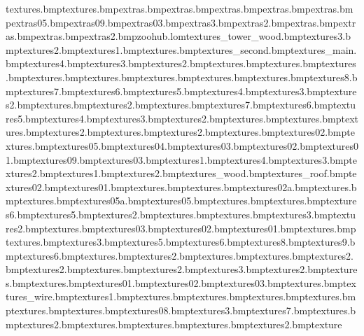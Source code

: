 textures\planetx.bmp textures\grassy.bmp extras\zoohubxdoor.bmp extras\westhubxdoor.bmp extras\tazmaniahubxdoor.bmp extras\tazcageroof.bmp extras\tazcage.bmp extras\spookystake05.bmp extras\snowbeam09.bmp extras\snowbeam03.bmp extras\safwarmwood3.bmp extras\safwarmwood2.bmp extras\safwarmwood.bmp extras\metaledges.bmp extras\cityhubxdoor.bmp extras\aquasandcas2.bmp zoohub.lom textures\zoo_tower_wood.bmp textures\zoosign3.bmp textures\zoosign2.bmp textures\zoosign1.bmp textures\zoopathjoiner.bmp textures\zoohub_second.bmp textures\zoohub_main.bmp textures\zoohubwall4.bmp textures\zoohubwall3.bmp textures\zoohubwall2.bmp textures\zoohubwall.bmp textures\zoohubpillersaf.bmp textures\zoohubpillerice.bmp textures\zoohubpilleraqua.bmp textures\zoohubpiller.bmp textures\zoohubpathisaf.bmp textures\zoohubpathice.bmp textures\zoohubpathaqua.bmp textures\zoohubpath8.bmp textures\zoohubpath7.bmp textures\zoohubpath6.bmp textures\zoohubpath5.bmp textures\zoohubpath4.bmp textures\zoohubpath3.bmp textures\zoohubpath2.bmp textures\zoohubpath.bmp textures\zoohubjetty2.bmp textures\zoohubjetty.bmp textures\zoohubgrass7.bmp textures\zoohubgrass6.bmp textures\zoohubgrass5.bmp textures\zoohubgrass4.bmp textures\zoohubgrass3.bmp textures\zoohubgrass2.bmp textures\zoohubgrass.bmp textures\zoohubgate.bmp textures\zoohubbankedge.bmp textures\yellow2.bmp textures\wtcane.bmp textures\woodplank2.bmp textures\woodplank.bmp textures\woodblock02.bmp textures\wires.bmp textures\whackbit05.bmp textures\whackbit04.bmp textures\whackbit03.bmp textures\whackbit02.bmp textures\whackbit01.bmp textures\waterfall09.bmp textures\waterfall03.bmp textures\trunkred1.bmp textures\trunk4.bmp textures\trunk3.bmp textures\trunk2.bmp textures\trunk1.bmp textures\treeleave2.bmp textures\tower_wood.bmp textures\tower_roof.bmp textures\tower02.bmp textures\tower01.bmp textures\tower.bmp textures\test.bmp textures\tazwood02a.bmp textures\tazwantedposback.bmp textures\tazwanted.bmp textures\tazfern05a.bmp textures\tazfern05.bmp textures\tazcageroof.bmp textures\tazcageplaque.bmp textures\tazcagelock6.bmp textures\tazcagelock5.bmp textures\tazcagelock2.bmp textures\tazcagelock.bmp textures\tazcagegrass.bmp textures\tazcage3.bmp textures\tazcage2.bmp textures\tazcage.bmp textures\splinter03.bmp textures\splinter02.bmp textures\splinter01.bmp textures\alightfloor.bmp textures\alightroof.bmp textures\animalcrate3.bmp textures\animalcrate5.bmp textures\animalcrate6.bmp textures\animalcrate8.bmp textures\animalcrate9.bmp textures\aquadock6.bmp textures\aquapoles.bmp textures\aquapoles2.bmp textures\aquaropeholds.bmp textures\aquasandcas.bmp textures\aquasandcas2.bmp textures\aquasandjoiner2.bmp textures\aquaseawall.bmp textures\aquaseawall2.bmp textures\aquasoapbox3.bmp textures\aquawelcome2.bmp textures\aquawelcomesign.bmp textures\banana.bmp textures\bananacrate01.bmp textures\bananacrate02.bmp textures\bananacrate03.bmp textures\bananapeel.bmp textures\barbed_wire.bmp textures\bombbit1.bmp textures\candycane.bmp textures\castledrawb.bmp textures\castledrawzoohub.bmp textures\castleholes.bmp textures\chain.bmp textures\chrome.bmp textures\chubsafe08.bmp textures\clothes3.bmp textures\clothes7.bmp textures\cloud.bmp textures\cloud2.bmp textures\cross.bmp textures\dinghandle.bmp textures\dinghyrope.bmp textures\dishbrush2.bmp texture